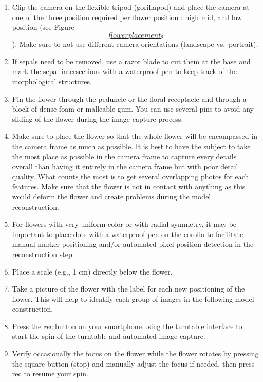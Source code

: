 \documentclass[
]{book}
\theoremstyle{definition}
\theoremstyle{definition}
\theoremstyle{definition}
\theoremstyle{definition}
\theoremstyle{remark}
\begin{document}
\begin{enumerate}
\def\labelenumi{\arabic{enumi}.}
\item
  Clip the camera on the flexible tripod (gorillapod) and place the
  camera at one of the three position required per flower position :
  high mid, and low position (see Figure
  \protect\hyperlink{flowerplacement_2}{\[flowerplacement_2\]}). Make sure to not use different
  camera orientations (landscape vs.~portrait).
\item
  If sepals need to be removed, use a razor blade to cut them at the
  base and mark the sepal intersections with a waterproof pen to keep
  track of the morphological structures.
\item
  Pin the flower through the peduncle or the floral receptacle and
  through a block of dense foam or malleable gum. You can use several
  pins to avoid any sliding of the flower during the image capture
  process.
\item
  Make sure to place the flower so that the whole flower will be
  encompassed in the camera frame as much as possible. It is best to
  have the subject to take the most place as possible in the camera
  frame to capture every details overall than having it entirely in
  the camera frame but with poor detail quality. What counts the most
  is to get several overlapping photos for each features. Make sure
  that the flower is not in contact with anything as this would deform
  the flower and create problems during the model reconstruction.
\item
  For flowers with very uniform color or with radial symmetry, it may
  be important to place dots with a waterproof pen on the corolla to
  facilitate manual marker positioning and/or automated pixel position
  detection in the reconstruction step.
\item
  Place a scale (e.g., 1 cm) directly below the flower.
\item
  Take a picture of the flower with the label for each new positioning
  of the flower. This will help to identify each group of images in
  the following model construction.
\item
  Press the \emph{rec} button on your smartphone using the turntable
  interface to start the spin of the turntable and automated image
  capture.
\item
  Verify occasionally the focus on the flower while the flower rotates
  by pressing the square button (stop) and manually adjust the focus
  if needed, then press rec to resume your spin.
\end{enumerate}
\end{document}
